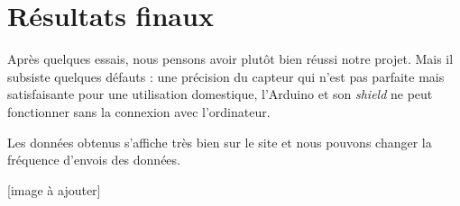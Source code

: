 \chapter{Résultats finaux}

Après quelques essais, nous pensons avoir plutôt bien réussi notre projet. Mais il subsiste quelques défauts : une précision du capteur qui n'est pas parfaite mais satisfaisante pour une utilisation domestique, l'Arduino et son \emph{shield} ne peut fonctionner sans la connexion avec l'ordinateur.

Les données obtenus s'affiche très bien sur le site et nous pouvons changer la fréquence d'envois des données.

[image à ajouter]
